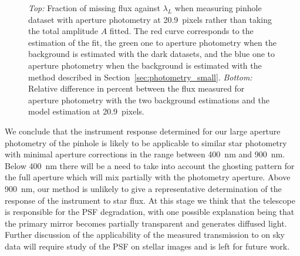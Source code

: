 \begin{figure}[h]
     \centering
     \caption{\textit{Top:} Fraction of missing flux against $\lambda_L$ when measuring \spinhole pinhole dataset with aperture photometry at \SI{20.9}{pixels} rather than taking the total amplitude $A$ fitted. The red curve corresponds to the estimation of the fit, the green one to aperture photometry when the background is estimated with the dark datasets, and the blue one to aperture photometry when the background is estimated with the method described in Section~\ref{sec:photometry_small}. \textit{Bottom:} Relative difference in percent between the flux measured for aperture photometry with the two background estimations and the model estimation at \SI{20.9}{pixels}.}
     \label{fig:bias_aperture}
\end{figure}

%
% 
We conclude that the instrument response determined for our large aperture photometry of the \spinhole pinhole is likely to be applicable to similar star photometry with minimal aperture corrections in the range between \SI{400}{\nano\meter} and \SI{900}{\nano\meter}. Below \SI{400}{\nano\meter} there will be a need to take into account the ghosting pattern for the full aperture which will mix partially with the photometry aperture. Above \SI{900}{\nano\meter}, our method is unlikely to give a representative determination of the response of the instrument to star flux. At this stage we think that the \SD telescope is responsible for the PSF degradation, with one possible explanation being that the primary mirror becomes partially transparent and generates diffused light. Further discussion of the applicability of the measured transmission to on sky data will require study of the PSF on stellar images and is left for future work.


